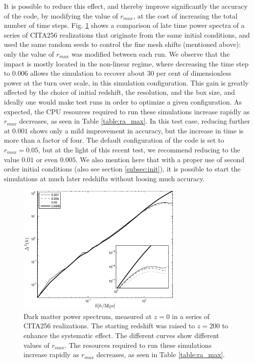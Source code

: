 \documentclass[useAMS,usenatbib]{mn2e}
\begin{document}
It is possible to reduce this effect, and thereby improve significantly 
the accuracy of the code, by modifying the value of $r_{max}$, at the cost of increasing the total number of time steps.
Fig. \ref{fig:ra_max} shows a comparison of late time power spectra of a series of CITA256 realizations that originate from the same initial conditions, 
and used the same random seeds to control the fine mesh shifts (mentioned above): only the value of $r_{max}$ was modified between each run. 
We observe that the impact is mostly located in the non-linear regime, where decreasing the time step to $0.006$ 
allows the simulation to recover about $30$ per cent of dimensionless power at the turn over scale, in this simulation configuration.
This gain is greatly affected by the choice of initial redshift, the resolution, and the box size, and ideally one would make
test runs in order to optimize a given configuration.  
As expected, the {\small CPU} resources required to run these simulations increase rapidly as $r_{max}$ decreases, as seen in Table \ref{table:ra_max}. 
In this test case, reducing further at $0.001$ shows only a mild improvement in accuracy, but the increase in time is more than a factor of four.
The default configuration of the code is set to $r_{max}=0.05$, but at the light of this recent test, we recommend reducing to the value $0.01$ or even $0.005$.
We also mention here that with a proper use of second order initial conditions (also see section \ref{subsec:init}), it is possible to start the simulations at much later redshifts
without loosing much accuracy.

\begin{figure}%
  \begin{center}
    \includegraphics[width=3.2in]{graphs/power_ra_max.eps}
  \caption{Dark matter power spectrum, measured at $z=0$ in a series of CITA256 realizations. 
 The starting redshift was raised to $z=200$ to enhance the systematic effect. The different curves show different values of $r_{max}$. 
  The resources required to run these simulations increase rapidly as $r_{max}$ decreases, as seen in Table \ref{table:ra_max}.    \label{fig:ra_max}}
\end{center}
\end{figure}
\end{document}
